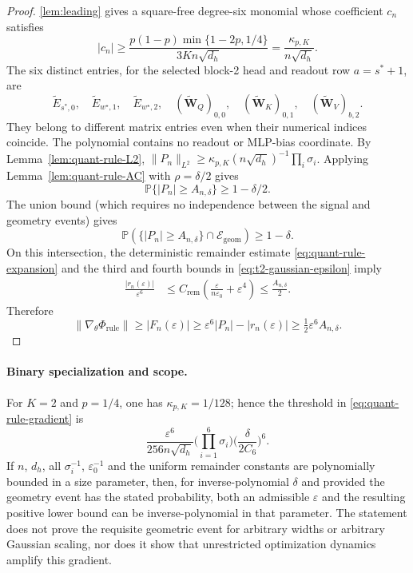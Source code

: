 \begin{proof}
\cref{lem:leading} gives a square-free degree-six monomial whose coefficient
$c_n$ satisfies
\begin{equation}
 |c_n|\ge
 \frac{p(1-p)\min\{1-2p,1/4\}}{3Kn\sqrt{d_h}}
 =\frac{\kappa_{p,K}}{n\sqrt{d_h}}.
 \label{eq:quant-rule-coeff}
\end{equation}
The six distinct entries, for the selected block-2 head and readout row
$a=s^\ast+1$, are
\[
 \tilde E_{s^\ast,0},\quad \tilde E_{w^\star,1},\quad
 \tilde E_{w^\star,2},\quad
 (\tilde{\mathbf W}_Q)_{0,0},\quad
 (\tilde{\mathbf W}_K)_{0,1},\quad
 (\tilde{\mathbf W}_V)_{b,2}.
\]
They belong to different matrix entries even when their numerical indices
coincide. The polynomial contains no readout or MLP-bias coordinate.
By Lemma~\ref{lem:quant-rule-L2},
$\|P_n\|_{L^2}\ge
 \kappa_{p,K}(n\sqrt{d_h})^{-1}\prod_i\sigma_i$.
Applying Lemma~\ref{lem:quant-rule-AC} with $\rho=\delta/2$ gives
\begin{equation}
 \mathbb P\{|P_n|\ge A_{n,\delta}\}\ge1-\delta/2.
\end{equation}
The union bound (which requires no independence between the signal and
geometry events) gives
\begin{equation}
 \mathbb P\!\left(
  \{|P_n|\ge A_{n,\delta}\}\cap\mathcal E_{\mathrm{geom}}
 \right)\ge1-\delta.
\end{equation}
On this intersection, the deterministic remainder estimate
\eqref{eq:quant-rule-expansion} and the third and fourth bounds in
\eqref{eq:t2-gaussian-epsilon} imply
\begin{align}
 \frac{|r_n(\varepsilon)|}{\varepsilon^6}
 &\le C_{\mathrm{rem}}\left(
       \frac{\varepsilon}{n\varepsilon_0}+\varepsilon^4\right)
 \le\frac{A_{n,\delta}}2.
\end{align}
Therefore
\begin{equation}
 \|\nabla_\theta\Phi_{\mathrm{rule}}\|
 \ge |F_n(\varepsilon)|
 \ge\varepsilon^6 |P_n|-|r_n(\varepsilon)|
 \ge\tfrac12\varepsilon^6A_{n,\delta}.
\end{equation}
\end{proof}

\paragraph{Binary specialization and scope.}
For $K=2$ and $p=1/4$, one has $\kappa_{p,K}=1/128$;
hence the threshold in \eqref{eq:quant-rule-gradient} is
\begin{equation}
 \frac{\varepsilon^6}{256n\sqrt{d_h}}
 \biggl(\prod_{i=1}^6\sigma_i\biggr)
 \biggl(\frac{\delta}{2C_6}\biggr)^6.
\end{equation}
If $n$, $d_h$, all $\sigma_i^{-1}$, $\varepsilon_0^{-1}$ and the
uniform remainder constants are polynomially bounded in a size parameter,
then, for inverse-polynomial $\delta$ and provided the geometry event has
the stated probability, both an admissible $\varepsilon$ and the resulting
positive lower bound can be inverse-polynomial in that parameter.
The statement does not prove the requisite geometric event for arbitrary
widths or arbitrary Gaussian scaling, nor does it show that unrestricted
optimization dynamics amplify this gradient.
